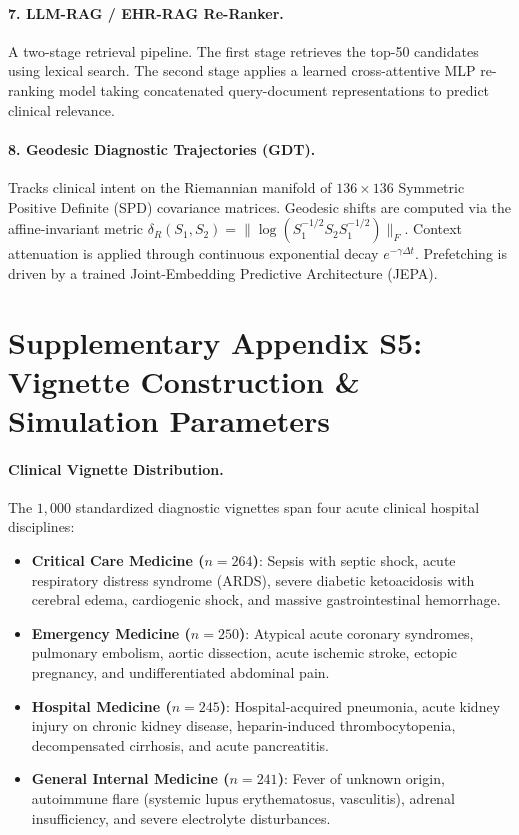 \documentclass[11pt]{article}
\begin{document}
\paragraph{7. LLM-RAG / EHR-RAG Re-Ranker.}
A two-stage retrieval pipeline. The first stage retrieves the top-50 candidates using lexical search. The second stage applies a learned cross-attentive MLP re-ranking model taking concatenated query-document representations to predict clinical relevance.

\paragraph{8. Geodesic Diagnostic Trajectories (GDT).}
Tracks clinical intent on the Riemannian manifold of $136 \times 136$ Symmetric Positive Definite (SPD) covariance matrices. Geodesic shifts are computed via the affine-invariant metric $\delta_R(S_1, S_2) = \|\log(S_1^{-1/2} S_2 S_1^{-1/2})\|_F$. Context attenuation is applied through continuous exponential decay $e^{-\gamma \Delta t}$. Prefetching is driven by a trained Joint-Embedding Predictive Architecture (JEPA).

\section{Supplementary Appendix S5: Vignette Construction \& Simulation Parameters}

\paragraph{Clinical Vignette Distribution.}
The $1{,}000$ standardized diagnostic vignettes span four acute clinical hospital disciplines:
\begin{itemize}
  \item \textbf{Critical Care Medicine ($n=264$)}: Sepsis with septic shock, acute respiratory distress syndrome (ARDS), severe diabetic ketoacidosis with cerebral edema, cardiogenic shock, and massive gastrointestinal hemorrhage.
  \item \textbf{Emergency Medicine ($n=250$)}: Atypical acute coronary syndromes, pulmonary embolism, aortic dissection, acute ischemic stroke, ectopic pregnancy, and undifferentiated abdominal pain.
  \item \textbf{Hospital Medicine ($n=245$)}: Hospital-acquired pneumonia, acute kidney injury on chronic kidney disease, heparin-induced thrombocytopenia, decompensated cirrhosis, and acute pancreatitis.
  \item \textbf{General Internal Medicine ($n=241$)}: Fever of unknown origin, autoimmune flare (systemic lupus erythematosus, vasculitis), adrenal insufficiency, and severe electrolyte disturbances.
\end{itemize}
\end{document}
